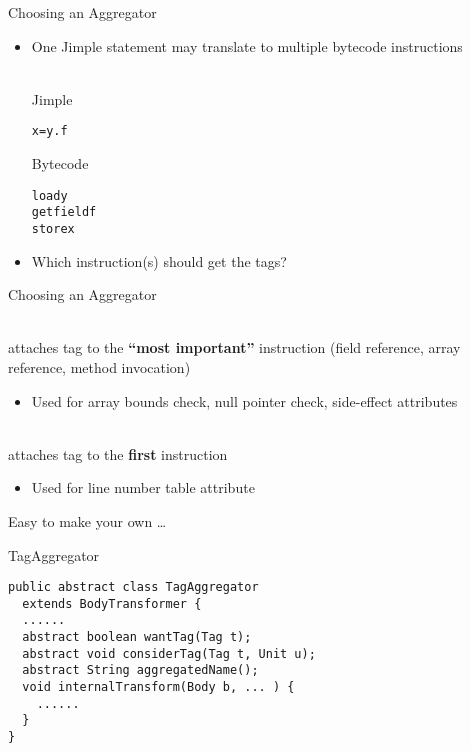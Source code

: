 \begin{slide}{Choosing an Aggregator}
\begin{itemize}
\item One Jimple statement may translate to multiple bytecode instructions\\
\ \\
\begin{minipage}[t]{45mm}
Jimple
\begin{alltt}
x = y.f
\end{alltt}
\end{minipage}
\begin{minipage}[t]{45mm}
Bytecode
\begin{alltt}
load y
getfield f
store x
\end{alltt}
\end{minipage}
\item Which instruction(s) should get the tags?
\end{itemize}
\end{slide}

\begin{slide}{Choosing an Aggregator}
\begin{description}
\item [ImportantTagAggregator]\ \\
attaches tag to the {\bf ``most important''} instruction
(field reference, array reference, method invocation)
\begin{itemize}
\item Used for array bounds check, null pointer check, side-effect attributes
\end{itemize}
\item [FirstTagAggregator]\ \\
attaches tag to the {\bf first} instruction
\begin{itemize}
\item Used for line number table attribute
\end{itemize}
\item Easy to make your own \ldots
\end{description}
\end{slide}


\begin{slide}{TagAggregator}
{\small
\begin{verbatim}
public abstract class TagAggregator 
  extends BodyTransformer {
  ......
  abstract boolean wantTag(Tag t);
  abstract void considerTag(Tag t, Unit u);
  abstract String aggregatedName();
  void internalTransform(Body b, ... ) { 
    ...... 
  }
}
\end{verbatim}
}
\end{slide}

